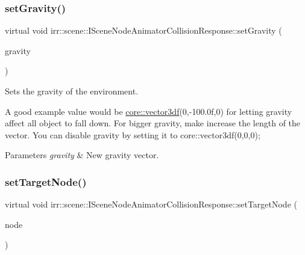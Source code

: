 \subsubsection{\texorpdfstring{set\+Gravity()}{setGravity()}}
{\footnotesize\ttfamily virtual void irr\+::scene\+::\+I\+Scene\+Node\+Animator\+Collision\+Response\+::set\+Gravity (\begin{DoxyParamCaption}\item[{const \hyperlink{namespaceirr_1_1core_a06f169d08b5c429f5575acb7edbad811}{core\+::vector3df} \&}]{gravity }\end{DoxyParamCaption})\hspace{0.3cm}{\ttfamily [pure virtual]}}



Sets the gravity of the environment. 

A good example value would be \hyperlink{namespaceirr_1_1core_a06f169d08b5c429f5575acb7edbad811}{core\+::vector3df}(0,-\/100.\+0f,0) for letting gravity affect all object to fall down. For bigger gravity, make increase the length of the vector. You can disable gravity by setting it to core\+::vector3df(0,0,0); 
\begin{DoxyParams}{Parameters}
{\em gravity} & New gravity vector. \\
\hline
\end{DoxyParams}
\mbox{\label{classirr_1_1scene_1_1ISceneNodeAnimatorCollisionResponse_a5b291ba9249c451779f76ab2154aa3c2}} 
\subsubsection{\texorpdfstring{set\+Target\+Node()}{setTargetNode()}}
{\footnotesize\ttfamily virtual void irr\+::scene\+::\+I\+Scene\+Node\+Animator\+Collision\+Response\+::set\+Target\+Node (\begin{DoxyParamCaption}\item[{\hyperlink{classirr_1_1scene_1_1ISceneNode}{I\+Scene\+Node} $\ast$}]{node }\end{DoxyParamCaption})\hspace{0.3cm}{\ttfamily [pure virtual]}}



